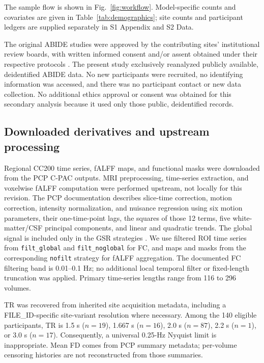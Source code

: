 \documentclass[10pt,letterpaper]{article}
\begin{document}
The sample flow is shown in Fig.~\ref{fig:workflow}. Model-specific counts and
covariates are given in Table~\ref{tab:demographics}; site counts and participant
ledgers are supplied separately in S1 Appendix and S2 Data.

The original ABIDE studies were approved by the contributing sites' institutional
review boards, with written informed consent and/or assent obtained under their
respective protocols \cite{DiMartino:2014abide}. The present study exclusively
reanalyzed publicly available, deidentified ABIDE data. No new participants were
recruited, no identifying information was accessed, and there was no participant
contact or new data collection. No additional ethics approval or consent was
obtained for this secondary analysis because it used only those public,
deidentified records.

\subsection*{Downloaded derivatives and upstream processing}
Regional CC200 time series, fALFF maps, and functional masks were downloaded from
the PCP C-PAC outputs. MRI preprocessing, time-series extraction, and voxelwise
fALFF computation were performed upstream, not locally for this revision.
The PCP documentation describes slice-time correction, motion correction,
intensity normalization, and nuisance regression using six motion parameters,
their one-time-point lags, the squares of those 12 terms, five white-matter/CSF
principal components, and linear and quadratic trends. The global signal is
included only in the GSR strategies \cite{PCPdocumentationRevision}.
We use filtered ROI time series from \texttt{filt\_global} and
\texttt{filt\_noglobal} for FC, and maps and masks from the corresponding
\texttt{nofilt} strategy for fALFF aggregation. The documented FC filtering band
is 0.01--0.1 Hz; no additional local temporal filter or fixed-length truncation
was applied. Primary time-series lengths range from 116 to 296 volumes.

TR was recovered from inherited site acquisition metadata, including a
FILE\_ID-specific site-variant resolution where necessary. Among the 140 eligible
participants, TR is 1.5 s ($n=19$), 1.667 s ($n=16$), 2.0 s ($n=87$), 2.2 s
($n=1$), or 3.0 s ($n=17$). Consequently, a universal 0.25-Hz Nyquist limit is
inappropriate. Mean FD comes from PCP summary metadata; per-volume censoring
histories are not reconstructed from those summaries.
\end{document}
